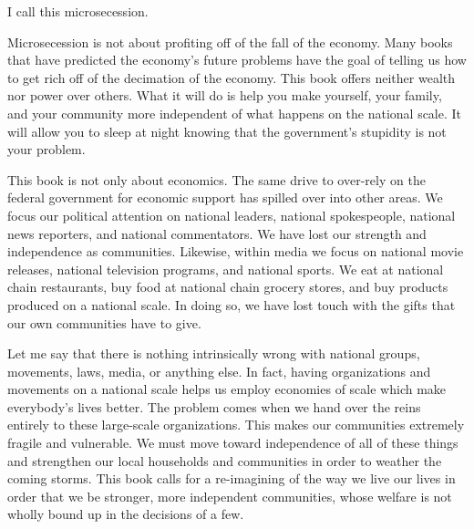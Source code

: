 \documentclass[letterpaper]{article}
\begin{document}
{\color{black}
I call this microsecession.}

{\color{black}
Microsecession is not about profiting off of the fall of the economy.
Many books that have predicted the economy’s future problems have the
goal of telling us how to get rich off of the decimation of the
economy. This book
\textcolor[rgb]{0.32941177,0.5529412,0.83137256}{offers} neither wealth
nor power over others. What it will do is help you make
you\textcolor[rgb]{0.32941177,0.5529412,0.83137256}{rself}, your
family, and your community more independent of what happens on the
national scale. It will allow you to sleep at night knowing that
\textcolor[rgb]{0.32941177,0.5529412,0.83137256}{the government’s
}stupidity is not your problem.}

{\color{black}
This book is not only about economics. The same drive to over-rely on
the federal government for economic support has spilled over into other
areas. We focus our political attention on national leaders, national
spokespeople, national news reporters, and national commentators. We
have lost our strength and independence as communities. Likewise,
within media we focus on national movie releases, national television
programs, and national sports. We eat at national chain restaurants,
buy food at national chain grocery stores, and buy products produced on
a national scale. In doing so, we have lost touch with the gifts that
our own communities have to give. }

{\color{black}
Let me say that there is nothing intrinsically wrong with national
groups, movements, laws, media, or anything else. In fact, having
organizations and movements on a national scale helps us employ
economies of scale which make everybody’s lives better. The problem
comes when we hand over the reins entirely to these large-scale
organizations. This makes our communities extremely fragile and
vulnerable. We must move toward independence of all of these things and
strengthen our local households and communities in order to weather the
coming storms. This book calls for a re-imagining of the way we live
our lives in order that we be stronger, more independent communities,
whose welfare is not wholly bound up in the decisions of a few.}
\end{document}
